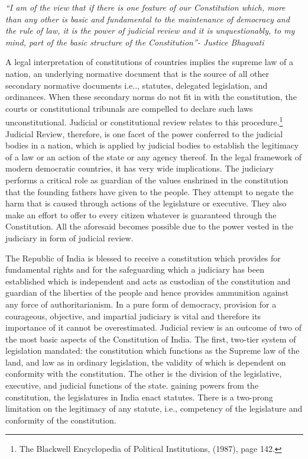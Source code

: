 \begin{multicols}{2}

\noi
\textit{“I am of the view that if there is one feature of our Constitution which, more than any
other is basic and fundamental to the maintenance of democracy and the rule of law,
it is the power of judicial review and it is unquestionably, to my mind, part of the basic
structure of the Constitution”- Justice Bhagwati}


\noi
A legal interpretation of constitutions of countries implies the supreme law of a nation,
an underlying normative document that is the source of all other secondary normative
documents i.e.., statutes, delegated legislation, and ordinances. When these secondary
norms do not fit in with the constitution, the courts or constitutional tribunals are
compelled to declare such laws unconstitutional. Judicial or constitutional review
relates to this procedure.\footnote{ The Blackwell Encyclopedia of Political Institutions, (1987), page 142.}
Judicial Review, therefore, is one facet of the power
conferred to the judicial bodies in a nation, which is applied by judicial bodies to
establish the legitimacy of a law or an action of the state or any agency thereof. In the
legal framework of modern democratic countries, it has very wide implications. The
judiciary performs a critical role as guardian of the values enshrined in the constitution
that the founding fathers have given to the people. They attempt to negate the harm
that is caused through actions of the legislature or executive. They also make an effort
to offer to every citizen whatever is guaranteed through the Constitution. All the
aforesaid becomes possible due to the power vested in the judiciary in form of judicial
review.

\noi
The Republic of India is blessed to receive a constitution which provides for
fundamental rights and for the safeguarding which a judiciary has been established which is independent and acts as custodian of the constitution and guardian of the
liberties of the people and hence provides ammunition against any force of
authoritarianism. In a pure form of democracy, provision for a courageous, objective,
and impartial judiciary is vital and therefore its importance of it cannot be overestimated. Judicial review is an outcome of two of the most basic aspects of the
Constitution of India. The first, two-tier system of legislation mandated: the
constitution which functions as the Supreme law of the land, and law as in ordinary
legislation, the validity of which is dependent on conformity with the constitution. The
other is the division of the legislative, executive, and judicial functions of the state.
gaining powers from the constitution, the legislatures in India enact statutes. There is a
two-prong limitation on the legitimacy of any statute, i.e., competency of the
legislature and conformity of the constitution. 


\end{multicols}
